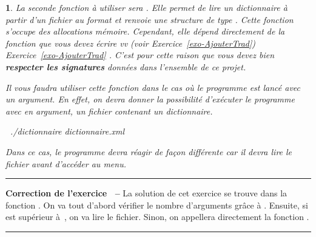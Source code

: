 \documentclass[a4paper]{article}
\makeatletter
\newenvironment{Correction}{\par\tiny\blue\rule[1ex]{\textwidth}{1pt}\par\normalsize\textbf{\sffamily{}Correction de l'exercice~\theExo{} -- }}{\par\tiny\blue\rule[1ex]{\textwidth}{1pt}\par}
\newtheorem{Exo}{{\sffamily{Exercice}}}
\newcommand{\ExoRef}[2][]{\def\@Un{#1}\def\@Deux{#2}\def\@Voir{v}%
		\ifx\@Un\@Voir%
		(voir Exercice~\vref{#2})%
		\else%
		Exercice~\vref{#2}%
		\fi}
\makeatother
\begin{document}
				\begin{Exo}\label{exo-LireDictionnaire}
					La seconde fonction à utiliser sera .
					Elle permet de lire un dictionnaire à partir d'un fichier au format  et renvoie une structure de type .
					Cette fonction s'occupe des allocations mémoire.
					Cependant, elle dépend directement de la fonction  que vous devez écrire \ExoRef[v]{exo-AjouterTrad}.
					C'est pour cette raison que vous devez bien \textbf{respecter les signatures} données dans l'ensemble de ce projet.

					Il vous faudra utiliser cette fonction dans le cas où le programme est lancé avec un argument.
					En effet, on devra donner la possibilité d'exécuter le programme avec en argument, un fichier  contenant un dictionnaire.
					\begin{Code*}
$~$ ./dictionnaire dictionnaire.xml
					\end{Code*}
					Dans ce cas, le programme devra réagir de façon différente car il devra lire le fichier avant d'accéder au menu.
				\end{Exo}
				\begin{Correction}
					La solution de cet exercice se trouve dans la fonction  .
					On va tout d'abord vérifier le nombre d'arguments grâce à .
					Ensuite, si  est supérieur à~, on va lire le fichier.
					Sinon, on appellera directement la fonction .
				\end{Correction}

		\appendix
\end{document}
